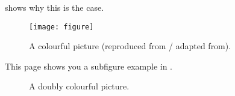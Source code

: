  shows why this is the case.
\begin{figure}[!htb]
  \centering
  \texttt{[image: figure]}
  \caption{A colourful picture (reproduced from / adapted from).}
  \label{Figure:figex}
\end{figure}

This page shows you a subfigure example in .
\begin{figure}[!htb]
  \centering
  \caption{A doubly colourful picture.}
  \label{Figure:figsubex}
\end{figure}
